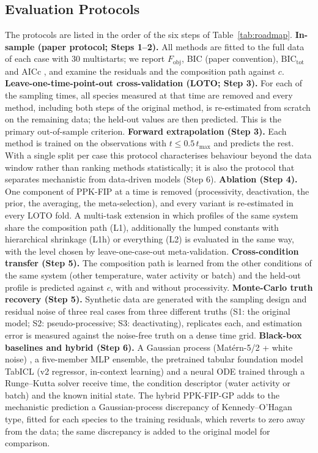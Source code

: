 \subsection{Evaluation Protocols}
The protocols are listed in the order of the six steps of Table~\ref{tab:roadmap}.
\textbf{In-sample (paper protocol; Steps 1--2).} All methods are fitted to the full data of each case with 30 multistarts; we report $F_\mathrm{obj}$, BIC (paper convention), $\mathrm{BIC}_\mathrm{tot}$ and AICc \cite{hurvich1989}, and examine the residuals and the composition path against $c$.
\textbf{Leave-one-time-point-out cross-validation (LOTO; Step 3).} For each of the \NLotoFolds{} sampling times, all species measured at that time are removed and every method, including both steps of the original method, is re-estimated from scratch on the remaining data; the held-out values are then predicted. This is the primary out-of-sample criterion.
\textbf{Forward extrapolation (Step 3).} Each method is trained on the observations with $t\le0.5\,t_\mathrm{max}$ and predicts the rest. With a single split per case this protocol characterises behaviour beyond the data window rather than ranking methods statistically; it is also the protocol that separates mechanistic from data-driven models (Step 6).
\textbf{Ablation (Step 4).} One component of PPK-FIP at a time is removed (processivity, deactivation, the prior, the averaging, the meta-selection), and every variant is re-estimated in every LOTO fold. A multi-task extension in which profiles of the same system share the composition path (L1), additionally the lumped constants with hierarchical shrinkage (L1h) or everything (L2) is evaluated in the same way, with the level chosen by leave-one-case-out meta-validation.
\textbf{Cross-condition transfer (Step 5).} The composition path is learned from the other conditions of the same system (other temperature, water activity or batch) and the held-out profile is predicted against $c$, with and without processivity.
\textbf{Monte-Carlo truth recovery (Step 5).} Synthetic data are generated with the sampling design and residual noise of three real cases from three different truths (S1: the original model; S2: pseudo-processive; S3: deactivating), \NSimReps{} replicates each, and estimation error is measured against the noise-free truth on a dense time grid.
\textbf{Black-box baselines and hybrid (Step 6).} A Gaussian process (Matérn-5/2 + white noise) \cite{rasmussen2006}, a five-member MLP ensemble, the pretrained tabular foundation model TabICL (v2 regressor, in-context learning) \cite{qu2025tabicl} and a neural ODE trained through a Runge--Kutta solver \cite{chen2018} receive time, the condition descriptor (water activity or batch) and the known initial state. The hybrid PPK-FIP-GP adds to the mechanistic prediction a Gaussian-process discrepancy of Kennedy--O'Hagan type, fitted for each species to the training residuals, which reverts to zero away from the data; the same discrepancy is added to the original model for comparison.

